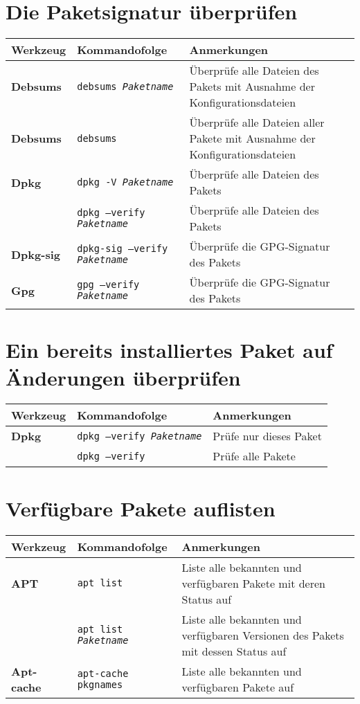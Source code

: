 \documentclass[10pt]{article}
\begin{document}
\section{Die Paketsignatur überprüfen}
\begin{tabular}{ p{3.5cm} p{9cm} p{11cm}}
  \hline
  \rowcolor{Gray}
  \textbf{Werkzeug} & \textbf{Kommandofolge} & \textbf{Anmerkungen} \\
  \hline 
  \textbf{Debsums} & \texttt{debsums \textit{Paketname}} & Überprüfe alle Dateien des Pakets mit Ausnahme der Konfigurationsdateien\\
  \rowcolor{Gray}
  \textbf{Debsums} & \texttt{debsums} & Überprüfe alle Dateien aller Pakete mit Ausnahme der Konfigurationsdateien \\
  \textbf{Dpkg} & \texttt{dpkg -V \textit{Paketname}} & Überprüfe alle Dateien des Pakets \\
  \rowcolor{Gray}
  & \texttt{dpkg --verify \textit{Paketname}} & Überprüfe alle Dateien des Pakets \\
  \textbf{Dpkg-sig} & \texttt{dpkg-sig --verify \textit{Paketname}} & Überprüfe die GPG-Signatur des Pakets \\
  \rowcolor{Gray}
  \textbf{Gpg} & \texttt{gpg --verify \textit{Paketname}} & Überprüfe die GPG-Signatur des Pakets \\
  \hline
\end{tabular}

\section{Ein bereits installiertes Paket auf Änderungen überprüfen}
\begin{tabular}{ p{3.5cm} p{9cm} p{11cm}}
  \hline
  \rowcolor{Gray}
  \textbf{Werkzeug} & \textbf{Kommandofolge} & \textbf{Anmerkungen} \\
  \hline 
  \textbf{Dpkg} & \texttt{dpkg --verify \textit{Paketname}} & Prüfe nur dieses Paket \\
  \rowcolor{Gray}
  & \texttt{dpkg --verify} & Prüfe alle Pakete \\
  \hline
\end{tabular}

\newpage

\cheatsheet

\section{Verfügbare Pakete auflisten}
\begin{tabular}{ p{3.5cm} p{9cm} p{11cm}}
  \hline
  \rowcolor{Gray}
  \textbf{Werkzeug} & \textbf{Kommandofolge} & \textbf{Anmerkungen} \\
  \hline 
  \textbf{APT} & \texttt{apt list} & Liste alle bekannten und verfügbaren Pakete mit deren Status auf\\
  \rowcolor{Gray}
  & \texttt{apt list \textit{Paketname}} & Liste alle bekannten und verfügbaren Versionen des Pakets mit dessen Status auf\\
  \textbf{Apt-cache} & \texttt{apt-cache pkgnames} & Liste alle bekannten und verfügbaren Pakete auf\\
  \hline
\end{tabular}
\end{document}
